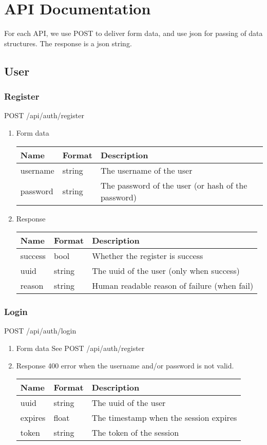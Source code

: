 \documentclass[11pt]{article}
\author{Jimmy Z}
\date{\today}
\title{}
\begin{document}
\tableofcontents

\section{API Documentation}
\label{sec:orgaa3e908}
For each API, we use POST to deliver form data, and use json for passing of
data structures. The response is a json string.
\subsection{User}
\label{sec:org6b7eb8c}
\subsubsection{Register}
\label{sec:org649a170}
POST /api/auth/register
\begin{enumerate}
\item Form data
\label{sec:org0bfd702}
\begin{center}
\begin{tabular}{lll}
Name & Format & Description\\
\hline
username & string & The username of the user\\
password & string & The password of the user (or hash of the password)\\
\end{tabular}
\end{center}
\item Response
\label{sec:org9f2bd78}
\begin{center}
\begin{tabular}{lll}
Name & Format & Description\\
\hline
success & bool & Whether the register is success\\
uuid & string & The uuid of the user (only when success)\\
reason & string & Human readable reason of failure (when fail)\\
\end{tabular}
\end{center}
\end{enumerate}
\subsubsection{Login}
\label{sec:org38b7ee0}
POST /api/auth/login
\begin{enumerate}
\item Form data
\label{sec:org3445e95}
See POST /api/auth/register
\item Response
\label{sec:org4251e91}
400 error when the username and/or password is not valid.
\begin{center}
\begin{tabular}{lll}
Name & Format & Description\\
\hline
uuid & string & The uuid of the user\\
expires & float & The timestamp when the session expires\\
token & string & The token of the session\\
\end{tabular}
\end{center}
\end{enumerate}
\end{document}

